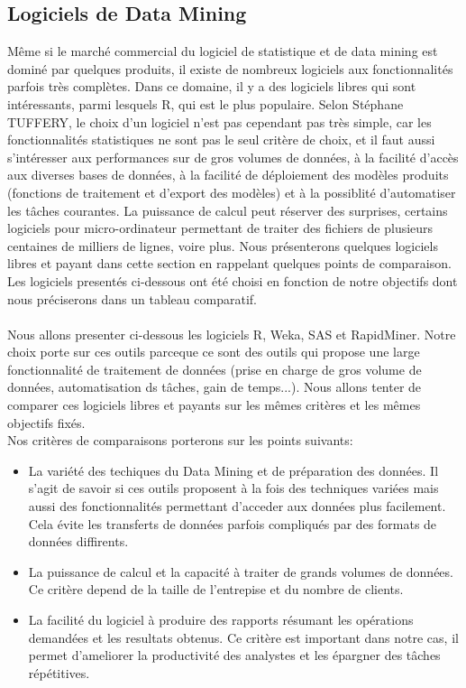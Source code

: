 \documentclass[11pt,a4paper]{report}
\begin{document}
\subsection{Logiciels de Data Mining \label{log_dm}}
Même si le marché commercial du logiciel de statistique et de data mining est dominé par quelques produits, il existe de nombreux logiciels aux fonctionnalités parfois très complètes. Dans ce domaine, il y a des logiciels libres qui sont intéressants, parmi lesquels R, qui est le plus populaire. Selon Stéphane TUFFERY, le choix d'un logiciel n'est pas cependant pas très simple, car les fonctionnalités statistiques ne sont pas le seul critère de choix, et il faut aussi s'intéresser aux performances sur de gros volumes de données, à la facilité d'accès aux diverses bases de données, à la facilité de déploiement des modèles produits (fonctions de traitement et d'export des modèles) et à la possiblité d'automatiser les tâches courantes. La puissance de calcul peut réserver des surprises, certains logiciels pour micro-ordinateur permettant de traiter des fichiers de plusieurs centaines de milliers de lignes, voire plus. Nous présenterons quelques logiciels libres et payant dans cette section en rappelant quelques points de comparaison.\\
Les logiciels presentés ci-dessous ont été choisi en fonction de notre objectifs dont nous préciserons dans un tableau comparatif. \\\\

Nous allons presenter ci-dessous les logiciels R, Weka, SAS et RapidMiner. Notre choix porte sur ces outils parceque ce sont des outils qui propose une large fonctionnalité de traitement de données (prise en charge de gros volume de données, automatisation ds tâches, gain de temps...). Nous allons tenter de comparer ces logiciels libres et payants sur les mêmes critères et les mêmes objectifs fixés.\\

Nos critères de comparaisons porterons sur les points suivants: 
\begin{itemize}
\item La variété des techiques du Data Mining et de préparation des données. Il s'agit de savoir si ces outils proposent à la fois des techniques variées mais aussi des fonctionnalités permettant d'acceder aux données plus facilement. Cela évite les transferts de données parfois compliqués par des formats de données diffirents. 
\item  La puissance de calcul et la capacité à traiter de grands volumes de données. Ce critère depend de la taille de l'entrepise et du nombre de clients. 
\item La facilité du logiciel à produire des rapports résumant les opérations demandées et les resultats obtenus.
Ce critère est important dans notre cas, il permet d'ameliorer la productivité des analystes et les épargner des tâches répétitives. 
\end{itemize}
\end{document}
